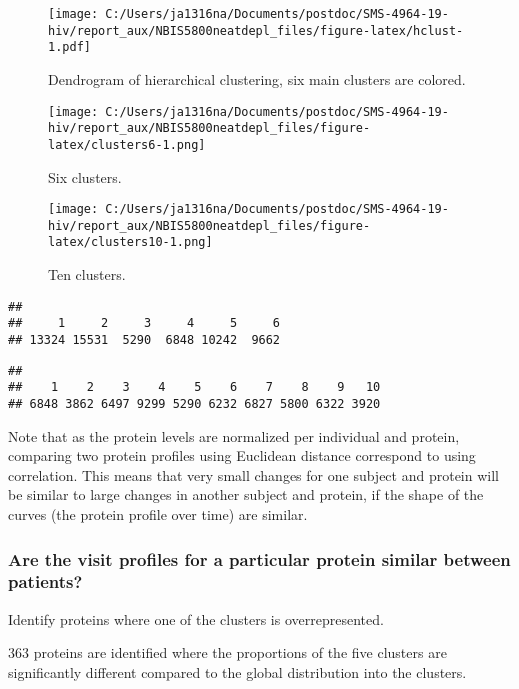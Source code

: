 \documentclass[
]{article}
\begin{document}
\begin{figure}
\centering
\texttt{[image: C:/Users/ja1316na/Documents/postdoc/SMS-4964-19-hiv/report\_aux/NBIS5800neatdepl\_files/figure-latex/hclust-1.pdf]}
\caption{\label{fig:hclust}Dendrogram of hierarchical clustering, six main clusters are colored.}
\end{figure}

\begin{figure}
\centering
\texttt{[image: C:/Users/ja1316na/Documents/postdoc/SMS-4964-19-hiv/report\_aux/NBIS5800neatdepl\_files/figure-latex/clusters6-1.png]}
\caption{\label{fig:clusters6}Six clusters.}
\end{figure}

\begin{figure}
\centering
\texttt{[image: C:/Users/ja1316na/Documents/postdoc/SMS-4964-19-hiv/report\_aux/NBIS5800neatdepl\_files/figure-latex/clusters10-1.png]}
\caption{\label{fig:clusters10}Ten clusters.}
\end{figure}

\begin{verbatim}
## 
##     1     2     3     4     5     6 
## 13324 15531  5290  6848 10242  9662
\end{verbatim}

\begin{verbatim}
## 
##    1    2    3    4    5    6    7    8    9   10 
## 6848 3862 6497 9299 5290 6232 6827 5800 6322 3920
\end{verbatim}

Note that as the protein levels are normalized per individual and protein, comparing two protein profiles using Euclidean distance correspond to using correlation. This means that very small changes for one subject and protein will be similar to large changes in another subject and protein, if the shape of the curves (the protein profile over time) are similar.

\hypertarget{are-the-visit-profiles-for-a-particular-protein-similar-between-patients}{%
\subsubsection{Are the visit profiles for a particular protein similar between patients?}\label{are-the-visit-profiles-for-a-particular-protein-similar-between-patients}}

Identify proteins where one of the clusters is overrepresented.

363 proteins are identified where the proportions of the five clusters are significantly different compared to the global distribution into the clusters.
\end{document}
